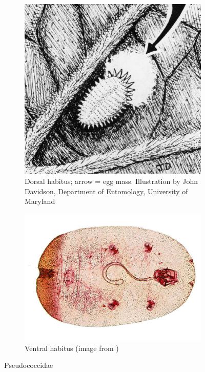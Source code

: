 \documentclass[letterpaper, 11pt]{article}
\begin{document}
\begin{figure}[ht!]
 \centering
 \begin{subfigure}[ht!]{0.38\textwidth}
  \includegraphics[width=\textwidth]{pseudococcidae.png}
  \caption{Dorsal habitus; arrow = egg mass. Illustration by John Davidson, Department of Entomology, University of Maryland}
  \label{fig:pseudococcid1}
 \end{subfigure}
 \qquad
 \begin{subfigure}[ht!]{0.45\textwidth}
  \includegraphics[width=\textwidth]{PseudococcidHabitus}
  \caption{Ventral habitus (image from \cite{ScaleNet})}
  \label{fig:pseudococcid2}
 \end{subfigure}
 \caption{Pseudococcidae}\label{fig:pseudococcid}
\end{figure}
\end{document}
